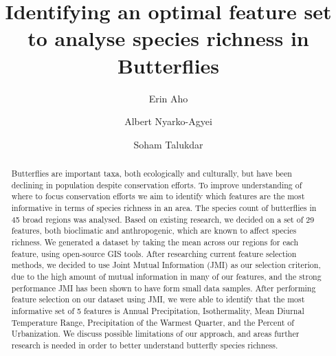 \documentclass[prl,showpacs,superscriptaddress,twocolumn,longbibliography]{revtex4-1}
\begin{document}
\author{Erin Aho}
\author{Albert Nyarko-Agyei}
\author{Soham Talukdar}

\title{Identifying an optimal feature set to analyse species richness in Butterflies}


\begin{abstract}
Butterflies are important taxa, both ecologically and culturally, but have been declining in population despite conservation efforts. To improve understanding of where to focus conservation efforts we aim to identify which features are the most informative in terms of species richness in an area.
The species count of butterflies in 45 broad regions was analysed. Based on existing research, we decided on a set of 29 features, both bioclimatic and anthropogenic, which are known to affect species richness. We generated a dataset by taking the mean across our regions for each feature, using open-source GIS tools. After researching current feature selection methods, we decided to use Joint Mutual Information (JMI) as our selection criterion, due to the high amount of mutual information in many of our features, and the strong performance JMI has been shown to have form small data samples. After performing feature selection on our dataset using JMI, we were able to identify that the most informative set of 5 features is Annual Precipitation, Isothermality, Mean Diurnal Temperature Range, Precipitation of the Warmest Quarter, and the Percent of Urbanization. We discuss possible limitations of our approach, and areas further research is needed in order to better understand butterfly species richness.
\end{abstract}

\maketitle









\end{document}

